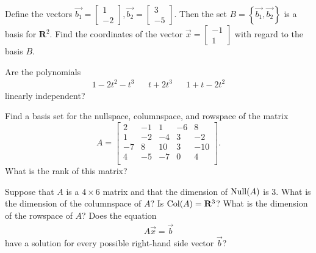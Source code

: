 \documentclass[12pt]{exam}
\newcommand{\real}{\mathbf{R}}
\begin{document}
\begin{questions}
\begin{parts}
\part
$\left\lbrace \left[
\begin{array}{c}
1 \\ 0 \\ -3
\end{array}
\right], 
\left[
\begin{array}{c}
3 \\ 1 \\ -4
\end{array}
\right],
\left[
\begin{array}{c}
-2 \\ -1 \\ 1
\end{array}
\right] \right\rbrace$
\end{parts}

\question
Define the vectors $\vec{b_1} = \left[ \begin{array}{c}
 1 \\ -2
\end{array} \right], 
\vec{b_2} = \left[ \begin{array}{c}
 3 \\ -5
\end{array} \right]$.  Then the set $B = \left\lbrace \vec{b_1}, \vec{b_2} \right\rbrace$ is a basis for $\real^2$.  Find the coordinates of the vector $\vec{x} = \left[ \begin{array}{c}
 -1 \\ 1
\end{array} \right]$
with regard to the basis $B$.


\question
Are the polynomials
\begin{align*}
	1-2t^2-t^3 && t + 2t^3 && 1 + t - 2t^2
\end{align*}
linearly independent? 

\question
Find a basis set for the nullspace, columnspace, and rowspace of the matrix
\begin{equation*}
	A = \left[ \begin{array}{ccccc}
		2 & -1 & 1 & -6 & 8 \\
		1 & -2 & -4 & 3 & -2 \\
		-7 & 8 & 10 & 3 & -10 \\
		4 & -5 & -7 & 0 & 4 \\
	\end{array} \right].
\end{equation*}
What is the rank of this matrix?

\question
Suppose that $A$ is a $4 \times 6$ matrix and that the dimension of $\textnormal{Null}(A)$ is 3.  What is the dimension of the columnspace of $A$?  Is $\textnormal{Col}(A) = \real^3$?  What is the dimension of the rowspace of $A$?  Does the equation
\begin{align*}
A \vec{x} = \vec{b}
\end{align*}
have a solution for every possible right-hand side vector $\vec{b}$?

\end{questions}
\end{document}
